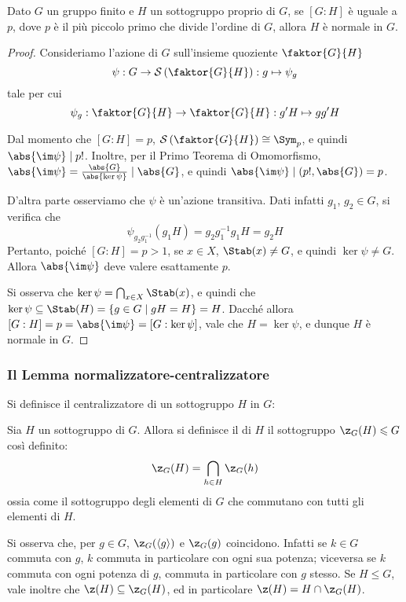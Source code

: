 \documentclass[11pt]{scrartcl}
\begin{document}
	\begin{proposition}
		\label{prop1.52}
		Dato $G$ un gruppo finito e $H$ un sottogruppo proprio di $G$, se $[G:H]$ è uguale
		a $p$, dove
		$p$ è il più piccolo primo che divide l'ordine di $G$, allora $H$ è normale
		in $G$.
	\end{proposition}
	
	\begin{proof}
		Consideriamo l'azione di $G$ sull'insieme quoziente $\faktor{G}{H}$ 
		\[
		\psi: G \to \mathcal{S}\left(\faktor{G}{H}\right) : g \mapsto \psi_g
		\]
		tale per cui
		\[
		\psi_g : \faktor{G}{H} \to \faktor{G}{H} : g'H \mapsto gg'H
		\]
		
		Dal momento che $[G : H] = p$, $\mathcal{S}\left(\faktor{G}{H}\right) \cong \Sym_p$,
		e quindi $\abs{\im \psi} \mid p!$. Inoltre, per il Primo Teorema di Omomorfismo,
		$\abs{\im \psi} = \frac{\abs{G}}{\abs{\ker \psi}} \mid \abs{G}$, e quindi
		$\abs{\im \psi} \mid (p!, \abs{G}) = p$. \medskip
		

		D'altra parte osserviamo che $\psi$ è un'azione transitiva. Dati infatti
		$g_1$, $g_2 \in G$, si verifica che
		\[ \psi_{g_2 g_1^{-1}}(g_1H) = g_2g_1^{-1}g_1H = g_2H \]
		Pertanto, poiché $[G : H] = p > 1$, se $x \in X$, $\Stab(x) \neq G$, e quindi
		$\ker \psi \neq G$. Allora $\abs{\im \psi}$ deve valere esattamente $p$. \medskip
		
		
		Si osserva che $\ker \psi = \bigcap_{x \in X} \Stab(x)$, e quindi
		che $\ker \psi \subseteq \Stab(H) = \{g \in G \mid gH = H \} = H$.
		Dacché allora $[G : H] = p = \abs{\im \psi} = [G : \ker \psi]$, vale
		che $H = \ker \psi$, e dunque $H$ è normale in $G$.
	\end{proof}
	
	
	\subsubsection{Il Lemma normalizzatore-centralizzatore}
	
	Si definisce il centralizzatore di un sottogruppo $H$ in $G$:
	
	\begin{definition}
		Sia $H$ un sottogruppo di $G$. Allora si definisce il 
		di $H$ il sottogruppo $\z_G(H) \leqslant G$ così definito:
		\[ \z_G(H) = \bigcap_{h \in H} \z_G(h) \]
		ossia come il sottogruppo degli elementi di $G$ che commutano con tutti gli
		elementi di $H$.
	\end{definition}
	
	\begin{remark}
		Si osserva che, per $g \in G$, $\z_G(\langle g \rangle)$ e $\z_G(g)$ coincidono.
		Infatti se $k \in G$ commuta con $g$, $k$ commuta in particolare con ogni sua
		potenza; viceversa se $k$ commuta con ogni potenza di $g$, commuta in particolare
		con $g$ stesso. Se $H \leqslant G$, vale inoltre che $\z(H) \subseteq \z_G(H)$,
		ed in particolare $\z(H) = H \cap \z_G(H)$.
	\end{remark}
	
\end{document}
